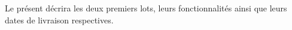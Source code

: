
Le présent \DSI{} décrira les deux premiers lots, leurs fonctionnalités ainsi que leurs dates de livraison respectives.


	
